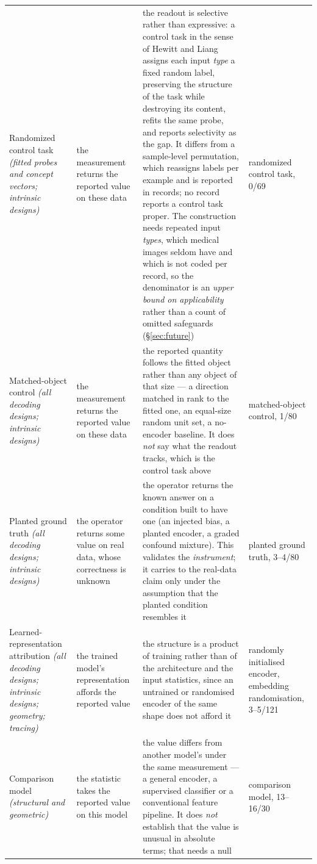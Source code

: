 \begin{table}
\begin{tabular}{@{}L{3.0cm}L{3.6cm}L{10.5cm}L{3.6cm}@{}}
Randomized control task \emph{(fitted probes and concept vectors; intrinsic designs)} & the measurement returns the reported value on these data & the readout is selective rather than expressive: a control task in the sense of Hewitt and Liang assigns each input \emph{type} a fixed random label, preserving the structure of the task while destroying its content, refits the same probe, and reports selectivity as the gap. It differs from a sample-level permutation, which reassigns labels per example and is reported in \Vperm{} records; no record reports a control task proper. The construction needs repeated input \emph{types}, which medical images seldom have and which is not coded per record, so the denominator is an \emph{upper bound on applicability} rather than a count of omitted safeguards (\S\ref{sec:future}) & randomized control task, 0/69 \\
Matched-object control \emph{(all decoding designs; intrinsic designs)} & the measurement returns the reported value on these data & the reported quantity follows the fitted object rather than any object of that size --- a direction matched in rank to the fitted one, an equal-size random unit set, a no-encoder baseline. It does \emph{not} say what the readout tracks, which is the control task above & matched-object control, 1/80 \\
Planted ground truth \emph{(all decoding designs; intrinsic designs)} & the operator returns some value on real data, whose correctness is unknown & the operator returns the known answer on a condition built to have one (an injected bias, a planted encoder, a graded confound mixture). This validates the \emph{instrument}; it carries to the real-data claim only under the assumption that the planted condition resembles it & planted ground truth, 3--4/80 \\
Learned-representation attribution \emph{(all decoding designs; intrinsic designs; geometry; tracing)} & the trained model's representation affords the reported value & the structure is a product of training rather than of the architecture and the input statistics, since an untrained or randomised encoder of the same shape does not afford it & randomly initialised encoder, embedding randomisation, 3--5/121 \\
Comparison model \emph{(structural and geometric)} & the statistic takes the reported value on this model & the value differs from another model's under the same measurement --- a general encoder, a supervised classifier or a conventional feature pipeline. It does \emph{not} establish that the value is unusual in absolute terms; that needs a null & comparison model, 13--16/30 \\

\end{tabular}
\end{table}
